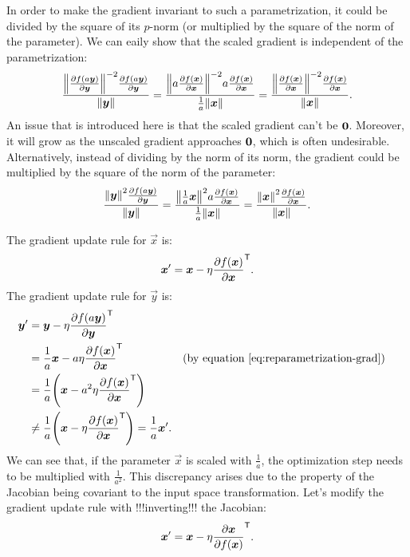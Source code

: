 \documentclass[twocolumn]{article}
\begin{document}
In order to make the gradient invariant to such a parametrization, it could be divided by the square of its $p$-norm (or multiplied by the square of the norm of the parameter).
We can eaily show that the scaled gradient is independent of the parametrization:
\begin{align}
    \frac{\enVert{\pd{f\del{a\vec y}}{\vec y}}^{-2}\pd{f\del{a\vec y}}{\vec y}}{\enVert{\vec y}}
    = \frac{\enVert{a\pd{f\del{\vec x}}{\vec x}}^{-2}a\pd{f\del{\vec x}}{\vec x}}{\frac{1}{a}\enVert{\vec x}}
    = \frac{\enVert{\pd{f\del{\vec x}}{\vec x}}^{-2}\pd{f\del{\vec x}}{\vec x}}{\enVert{\vec x}} \text{.}
\end{align}
An issue that is introduced here is that the scaled gradient can't be $\mathbf{0}$. Moreover, it will grow as the unscaled gradient approaches $\mathbf{0}$, which is often undesirable. Alternatively, instead of dividing by the norm of its norm, the gradient could be multiplied by the square of the norm of the parameter:
\begin{align}
    \frac{\enVert{\vec y}^{2}\pd{f\del{a\vec y}}{\vec y}}{\enVert{\vec y}}
    = \frac{\enVert{\frac{1}{a}\vec x}^{2}a\pd{f\del{\vec x}}{\vec x}}{\frac{1}{a}\enVert{\vec x}}
    = \frac{\enVert{\vec x}^{2}\pd{f\del{\vec x}}{\vec x}}{\enVert{\vec x}} \text{.} \\
\end{align}

The gradient update rule for $\vec x$ is:
\begin{align}
    \vec x' = \vec x -\eta\pd{f(\vec x)}{\vec x}^\tp \text{.}
\end{align}
The gradient update rule for $\vec y$ is:
\begin{align}
    \vec y' 
    &= \vec y -\eta\pd{f(a\vec y)}{\vec y} ^\tp \\
    &= \frac{1}{a}\vec x -a\eta\pd{f(\vec x)}{\vec x}^\tp &&\text{(by equation \eqref{eq:reparametrization-grad})} \\
    &= \frac{1}{a}\del{\vec x -a^2\eta\pd{f(\vec x)}{\vec x}^\tp}\\
    &\neq \frac{1}{a}\del{\vec x -\eta\pd{f(\vec x)}{\vec x}^\tp} = \frac{1}{a}\vec x' \text{.}
\end{align}
We can see that, if the parameter $\vec x$ is scaled with $\frac{1}{a}$, the optimization step needs to be
multiplied with $\frac{1}{a^2}$. This discrepancy arises due to the property of the Jacobian being covariant to the input space transformation. Let's modify the gradient update rule with !!!inverting!!! the Jacobian:
\begin{align}
    \vec x' = \vec x -\eta\pd{\vec x}{f(\vec x)}^\tp \text{.}
\end{align}
\end{document}
